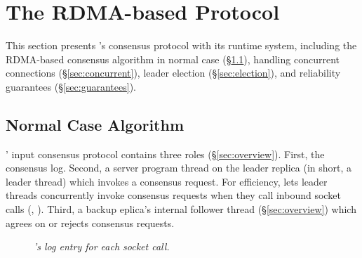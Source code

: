 \section{The RDMA-based \paxos Protocol} \label{sec:input}

This section presents \xxx's consensus protocol with its runtime system, 
including the RDMA-based consensus algorithm in normal case 
(\S\ref{sec:normal}), handling concurrent connections (\S\ref{sec:concurrent}), 
leader election (\S\ref{sec:election}), and reliability guarantees 
(\S\ref{sec:guarantees}).

\subsection{Normal Case Algorithm} \label{sec:normal}





\xxx' input consensus protocol contains three roles (\S\ref{sec:overview}). 
First, the \paxos consensus log. Second, a server program thread on the leader 
replica (in short, a leader thread) which invokes a consensus request. For 
efficiency, \xxx lets leader threads concurrently invoke consensus requests 
when they call inbound socket calls (\eg, \recv). Third, a backup eplica's \xxx 
internal follower thread (\S\ref{sec:overview}) which agrees on or rejects 
consensus requests.

\begin{figure}[h]
\vspace{-.2in}
\centering
\begin{minipage}{.5\textwidth}
\end{minipage}
\vspace{-.05in}
\caption{{\em \xxx's log entry for each socket call.}} \label{fig:logentry}
\vspace{-.1in}
\end{figure}

